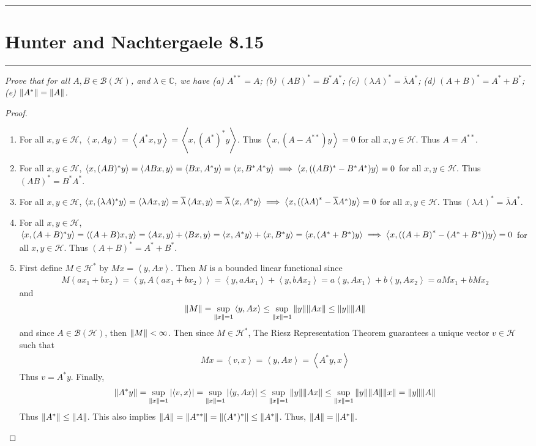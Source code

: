 \documentclass{article} %
\theoremstyle{plain}
\def\Cx{\mathbb{C}}
\newcommand{\VEC}[2]{\left\langle #1, #2 \right\rangle}
\newcommand{\Hilb}{\mathcal{H}}
\newcommand{\problem}[1]{
\vspace{.375cm}
\begin{minipage}{\textwidth}
    \begin{center}
        \noindent\rule{5cm}{1pt}
    \end{center}
    \section{\bf #1}
    \begin{center}
        \noindent\rule{5cm}{1pt}
    \end{center}
    \vspace{0.25cm}
\end{minipage}
}
\numberwithin{equation}{section} %
\numberwithin{figure}{section} %
\numberwithin{table}{section} %
\begin{document}
\problem{Hunter and Nachtergaele 8.15}
\emph{Prove that for all $A,B \in \mathcal{B}(\Hilb)$, and $\lambda \in \Cx$, we have (a) $A^{**} = A$; (b) $(AB)^* = B^*A^*$; (c) $(\lambda A)^* = \overline{\lambda}A^*$; (d) $(A + B)^* = A^* + B^*$; (e) $\norm{A^*} = \norm{A}$.}

\begin{proof}
    \begin{enumerate}[\it (a)]
        \item For all $x,y \in \Hilb$, $\VEC{x}{Ay} = \VEC{A^*x}{y} = \VEC{x}{(A^{*})^*y}$.  Thus $\VEC{x}{(A - A^{**})y} = 0$ for all $x, y \in \Hilb$.  Thus $A = A^{**}$.
        \item For all $x,y \in \Hilb$, $\VEC{x}{(AB)^*y} = \VEC{ABx}{y} = \VEC{Bx}{A^*y} = \VEC{x}{B^*A^*y} \implies \VEC{x}{\qty((AB)^* - B^*A^*)y} = 0$ for all $x, y \in \Hilb$.  Thus $(AB)^* = B^*A^*$.
        \item For all $x,y \in \Hilb$, $\VEC{x}{(\lambda A)^*y} = \VEC{\lambda Ax}{y} = \overline{\lambda}\VEC{Ax}{y} = \overline{\lambda}\VEC{x}{A^*y} \implies \VEC{x}{(\qty(\lambda A)^* - \overline{\lambda} A^*)y} = 0$ for all $x, y \in \Hilb$.  Thus $(\lambda A)^* = \overline{\lambda}A^*$.
        \item For all $x,y \in \Hilb$, $\VEC{x}{(A + B)^*y} = \VEC{(A + B)x}{y} = \VEC{Ax}{y} + \VEC{Bx}{y} = \VEC{x}{A^*y} + \VEC{x}{B^*y} = \VEC{x}{(A^* + B^*)y} \implies \VEC{x}{(\qty(A + B)^* - (A^* + B^*))y} = 0$ for all $x, y \in \Hilb$.  Thus $(A + B)^* = A^* + B^*$.
        \item First define $M \in \Hilb^*$ by $Mx = \VEC{y}{Ax}$.  Then $M$ is a bounded linear functional since
        \begin{align*}
            M(ax_1 + bx_2) = \VEC{y}{A(ax_1 + bx_2)} = \VEC{y}{aAx_1} + \VEC{y}{bAx_2} = a\VEC{y}{Ax_1} + b\VEC{y}{Ax_2} = aMx_1 + bMx_2
        \end{align*}
        and
        \begin{align*}
            \norm{M} = \sup_{\norm{x} = 1}\VEC{y}{Ax} \leq \sup_{\norm{x} = 1}\norm{y}\norm{Ax} \leq \norm{y}\norm{A}
        \end{align*}
        and since $A \in \mathcal{B}(\Hilb)$, then $\norm{M} < \infty$.  Then since $M \in \Hilb^*$, The Riesz Representation Theorem guarantees a unique vector $v \in \Hilb$ such that
        \begin{align*}
            Mx = \VEC{v}{x} = \VEC{y}{Ax} = \VEC{A^*y}{x}
        \end{align*}
        Thus $v = A^*y$.  Finally,
        \begin{align*}
            \norm{A^*y} = \sup_{\norm{x}=1}\left|\VEC{v}{x}\right| = \sup_{\norm{x}=1}\left|\VEC{y}{Ax}\right| \leq \sup_{\norm{x}=1}\norm{y}{\norm{Ax}} \leq \sup_{\norm{x}=1}\norm{y}\norm{A}\norm{x} = \norm{y}\norm{A}
        \end{align*}
        Thus $\norm{A^*} \leq \norm{A}$.  This also implies $\norm{A} = \norm{A^{**}} = \norm{(A^*)^*} \leq \norm{A^*}$.  Thus, $\norm{A} = \norm{A^*}$.
    \end{enumerate}
\end{proof}
\end{document}
